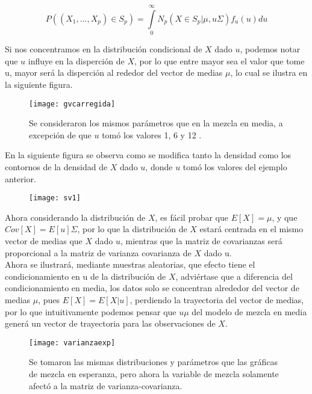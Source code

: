 \documentclass[11pt]{book}
\begin{document}
\begin{equation}
P((X_{1},...,X_{p})\in S_{p})=\underset{0}{\overset{\infty }{\int }}N_{p}(X\in S_{p}|\mu,u\Sigma)f_{u}(u)du 
\end{equation}

Si nos concentramos en la distribución condicional de $X$ dado $u$, podemos notar que $u$ influye en la disperción de $X$, por lo que entre mayor sea el valor que tome u, mayor será la disperción al rededor del vector de medias $\mu$, lo cual se ilustra en la siguiente figura. 

\begin{figure}[h]
\centering
\texttt{[image: gvcarregida]}
\caption{Se consideraron los mismos parámetros que en la mezcla en media, a excepción de que $u$ tomó los valores 1, 6 y 12 .}
\end{figure}

En la siguiente figura se observa como se modifica tanto la densidad como los contornos de la densidad de $X$ dado $u$, donde $u$ tomó los valores del ejemplo anterior.\\

\pagebreak

\begin{figure}
\centering
\texttt{[image: sv1]}
\end{figure}

Ahora considerando la distribución de $X$, es fácil probar que $E[X]=\mu$, y que $Cov[X]=E[u]\Sigma$, por lo que la distribución de $X$ estará centrada en el mismo vector de medias que $X$ dado $u$, mientras que la matriz de covarianzas será proporcional a la matriz de varianza covarianza de $X$ dado u.\\

Ahora se ilustrará, mediante muestras aleatorias, que efecto tiene el condicionamiento en u de la distribución de $X$, adviértase que a diferencia del condicionamiento en media, los datos solo se concentran alrededor del vector de medias $\mu$, pues $E[X]=E[X|u]$, perdiendo la trayectoria del vector de medias, por lo que intuitivamente podemos pensar que $u\mu$ del modelo de mezcla en media generá un vector de trayectoria para las observaciones de $X$.\\

\begin{figure}[h]
\centering
\texttt{[image: varianzaexp]}
\caption{Se tomaron las mismas distribuciones y parámetros que las gráficas de mezcla en esperanza, pero ahora la variable de mezcla solamente afectó a la matriz de varianza-covarianza.}
\end{figure}
\end{document}
